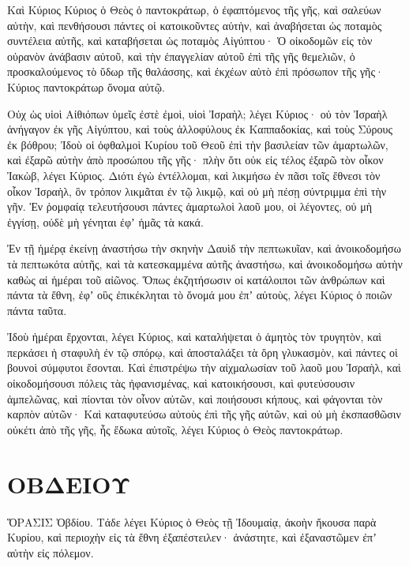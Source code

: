 \begin{spacing}{1.1}
\begin{multicols}{2}
Καὶ Κύριος Κύριος ὁ Θεὸς ὁ παντοκράτωρ, ὁ ἐφαπτόμενος τῆς γῆς, καὶ σαλεύων αὐτὴν, καὶ πενθήσουσι πάντες οἱ κατοικοῦντες αὐτὴν, καὶ ἀναβήσεται ὡς ποταμὸς συντέλεια αὐτῆς, καὶ καταβήσεται ὡς ποταμὸς Αἰγύπτου·
Ὁ οἰκοδομῶν εἰς τὸν οὐρανὸν ἀνάβασιν αὐτοῦ, καὶ τὴν ἐπαγγελίαν αὐτοῦ ἐπὶ τῆς γῆς θεμελιῶν, ὁ προσκαλούμενος τὸ ὕδωρ τῆς θαλάσσης, καὶ ἐκχέων αὐτὸ ἐπὶ πρόσωπον τῆς γῆς· Κύριος παντοκράτωρ ὄνομα αὐτῷ.

Οὐχ ὡς υἱοὶ Αἰθιόπων ὑμεῖς ἐστὲ ἐμοὶ, υἱοὶ Ἰσραὴλ; λέγει Κύριος· οὐ τὸν Ἰσραὴλ ἀνήγαγον ἐκ γῆς Αἰγύπτου, καὶ τοὺς ἀλλοφύλους ἐκ Καππαδοκίας, καὶ τοὺς Σύρους ἐκ βόθρου;
Ἰδοὺ οἱ ὀφθαλμοὶ Κυρίου τοῦ Θεοῦ ἐπὶ τὴν βασιλείαν τῶν ἁμαρτωλῶν, καὶ ἐξαρῶ αὐτὴν ἀπὸ προσώπου τῆς γῆς· πλὴν ὅτι οὐκ εἰς τέλος ἐξαρῶ τὸν οἶκον Ἰακὼβ, λέγει Κύριος.
Διότι ἐγὼ ἐντέλλομαι, καὶ λικμήσω ἐν πᾶσι τοῖς ἔθνεσι τὸν οἶκον Ἰσραὴλ, ὃν τρόπον λικμᾶται ἐν τῷ λικμῷ, καὶ οὐ μὴ πέσῃ σύντριμμα ἐπὶ τὴν γῆν.
Ἐν ῥομφαίᾳ τελευτήσουσι πάντες ἁμαρτωλοὶ λαοῦ μου, οἱ λέγοντες, οὐ μὴ ἐγγίσῃ, οὐδὲ μὴ γένηται ἐφʼ ἡμᾶς τὰ κακά.

Ἐν τῇ ἡμέρᾳ ἐκείνῃ ἀναστήσω τὴν σκηνὴν Δαυὶδ τὴν πεπτωκυῖαν, καὶ ἀνοικοδομήσω τὰ πεπτωκότα αὐτῆς, καὶ τὰ κατεσκαμμένα αὐτῆς ἀναστήσω, καὶ ἀνοικοδομήσω αὐτὴν καθὼς αἱ ἡμέραι τοῦ αἰῶνος.
Ὅπως ἐκζητήσωσιν οἱ κατάλοιποι τῶν ἀνθρώπων καὶ πάντα τὰ ἔθνη, ἐφʼ οὓς ἐπικέκληται τὸ ὄνομά μου ἐπʼ αὐτοὺς, λέγει Κύριος ὁ ποιῶν πάντα ταῦτα.

Ἰδοὺ ἡμέραι ἔρχονται, λέγει Κύριος, καὶ καταλήψεται ὁ ἀμητὸς τὸν τρυγητὸν, καὶ περκάσει ἡ σταφυλὴ ἐν τῷ σπόρῳ, καὶ ἀποσταλάξει τὰ ὄρη γλυκασμὸν, καὶ πάντες οἱ βουνοὶ σύμφυτοι ἔσονται.
Καὶ ἐπιστρέψω τὴν αἰχμαλωσίαν τοῦ λαοῦ μου Ἰσραὴλ, καὶ οἰκοδομήσουσι πόλεις τὰς ἠφανισμένας, καὶ κατοικήσουσι, καὶ φυτεύσουσιν ἀμπελῶνας, καὶ πίονται τὸν οἶνον αὐτῶν, καὶ ποιήσουσι κήπους, καὶ φάγονται τὸν καρπὸν αὐτῶν·
Καὶ καταφυτεύσω αὐτοὺς ἐπὶ τῆς γῆς αὐτῶν, καὶ οὐ μὴ ἐκσπασθῶσιν οὐκέτι ἀπὸ τῆς γῆς, ἧς ἔδωκα αὐτοῖς, λέγει Κύριος ὁ Θεὸς παντοκράτωρ.


\end{multicols}
\chapter{ΟΒΔΕΙΟΥ}
\begin{multicols}{2}

ὍΡΑΣΙΣ Ὀβδίου. Τάδε λέγει Κύριος ὁ Θεὸς τῇ Ἰδουμαίᾳ, ἀκοὴν ἤκουσα παρὰ Κυρίου, καὶ περιοχὴν εἰς τὰ ἔθνη ἐξαπέστειλεν· ἀνάστητε, καὶ ἐξαναστῶμεν ἐπʼ αὐτὴν εἰς πόλεμον.


\end{multicols}
\end{spacing}
